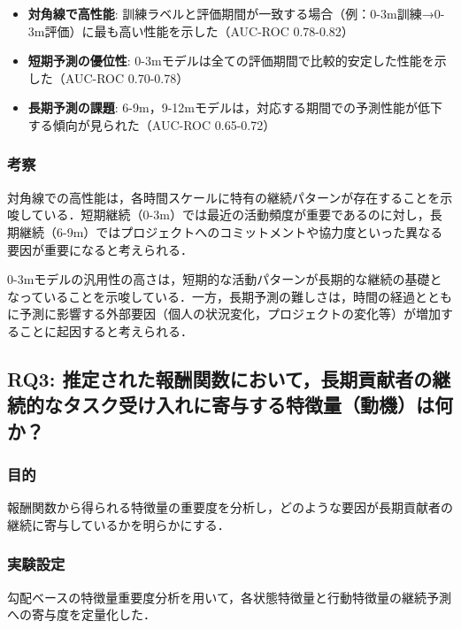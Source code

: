 \begin{itemize}
    \item \textbf{対角線で高性能}: 訓練ラベルと評価期間が一致する場合（例：0-3m訓練→0-3m評価）に最も高い性能を示した（AUC-ROC 0.78-0.82）
    \item \textbf{短期予測の優位性}: 0-3mモデルは全ての評価期間で比較的安定した性能を示した（AUC-ROC 0.70-0.78）
    \item \textbf{長期予測の課題}: 6-9m，9-12mモデルは，対応する期間での予測性能が低下する傾向が見られた（AUC-ROC 0.65-0.72）
\end{itemize}

\subsubsection{考察}
対角線での高性能は，各時間スケールに特有の継続パターンが存在することを示唆している．短期継続（0-3m）では最近の活動頻度が重要であるのに対し，長期継続（6-9m）ではプロジェクトへのコミットメントや協力度といった異なる要因が重要になると考えられる．

0-3mモデルの汎用性の高さは，短期的な活動パターンが長期的な継続の基礎となっていることを示唆している．一方，長期予測の難しさは，時間の経過とともに予測に影響する外部要因（個人の状況変化，プロジェクトの変化等）が増加することに起因すると考えられる．

\subsection{RQ3: 推定された報酬関数において，長期貢献者の継続的なタスク受け入れに寄与する特徴量（動機）は何か？}

\subsubsection{目的}
報酬関数から得られる特徴量の重要度を分析し，どのような要因が長期貢献者の継続に寄与しているかを明らかにする．

\subsubsection{実験設定}
勾配ベースの特徴量重要度分析を用いて，各状態特徴量と行動特徴量の継続予測への寄与度を定量化した．

